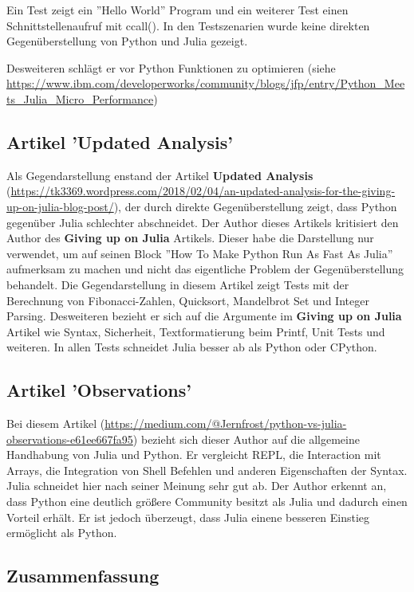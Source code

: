 \documentclass[11pt]{article}
\begin{document}
Ein Test zeigt ein ''Hello World'' Program und ein weiterer Test einen Schnittstellenaufruf mit ccall(). In den Testszenarien wurde keine direkten Gegenüberstellung von Python und Julia gezeigt. 

Desweiteren schlägt er vor Python Funktionen zu optimieren (siehe \url{https://www.ibm.com/developerworks/community/blogs/jfp/entry/Python_Meets_Julia_Micro_Performance})

\subsection{Artikel 'Updated Analysis'}

Als Gegendarstellung enstand der Artikel \textbf{Updated Analysis} (\url{https://tk3369.wordpress.com/2018/02/04/an-updated-analysis-for-the-giving-up-on-julia-blog-post/}), der durch direkte Gegenüberstellung zeigt, dass Python gegenüber Julia schlechter abschneidet. Der Author dieses Artikels kritisiert den Author des \textbf{Giving up on Julia} Artikels. Dieser habe die Darstellung nur verwendet, um auf seinen Block ''How To Make Python Run As Fast As Julia'' aufmerksam zu machen und nicht das eigentliche Problem der Gegenüberstellung behandelt. 
Die Gegendarstellung in diesem Artikel zeigt Tests mit der Berechnung von Fibonacci-Zahlen, Quicksort, Mandelbrot Set und Integer Parsing. Desweiteren bezieht er sich auf die Argumente im \textbf{Giving up on Julia} Artikel wie Syntax, Sicherheit, Textformatierung beim Printf, Unit Tests und weiteren.
In allen Tests schneidet Julia besser ab als Python oder CPython.

\subsection{Artikel 'Observations'}

Bei diesem Artikel (\url{https://medium.com/@Jernfrost/python-vs-julia-observations-e61ee667fa95}) bezieht sich dieser Author auf die allgemeine Handhabung von Julia und Python. Er vergleicht REPL, die Interaction mit Arrays, die Integration von Shell Befehlen und anderen Eigenschaften der Syntax. Julia schneidet hier nach seiner Meinung sehr gut ab. Der Author erkennt an, dass Python eine deutlich größere Community besitzt als Julia und dadurch einen Vorteil erhält. Er ist jedoch überzeugt, dass Julia einene besseren Einstieg ermöglicht als Python. 

\subsection{Zusammenfassung}
\end{document}
